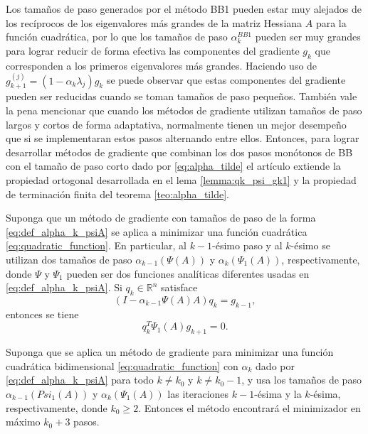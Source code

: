 Los tamaños de paso generados por el método BB1 pueden estar muy alejados de los recíprocos de los eigenvalores más grandes de la matriz Hessiana $A$ para la función cuadrática, por lo que los tamaños de paso $\alpha_k^{BB1}$ pueden ser muy grandes para lograr reducir de forma efectiva las componentes  del gradiente $g_k$ que corresponden a los primeros eigenvalores más grandes. Haciendo uso de $g_{k+1}^{(j)} = (1-\alpha_k\lambda_j)g_k$ se puede observar que estas componentes del gradiente pueden ser reducidas cuando se toman tamaños de paso pequeños. También vale la pena mencionar que cuando los métodos de gradiente utilizan tamaños de paso largos y cortos de forma adaptativa, normalmente tienen un mejor desempeño que si se implementaran estos pasos alternando entre ellos. Entonces, para lograr desarrollar métodos de gradiente que combinan los dos pasos monótonos de BB con el tamaño de paso corto dado por \ref{eq:alpha_tilde} el artículo extiende la propiedad ortogonal desarrollada en el lema \ref{lemma:qk_psi_gk1} y la propiedad de terminación finita del teorema \ref{teo:alpha_tilde}.

\begin{lema}
    Suponga que un método de gradiente con tamaños de paso de la forma \ref{eq:def_alpha_k_psiA} se aplica a minimizar una función cuadrática \ref{eq:quadratic_function}. En particular, al $k-1$-ésimo paso y al $k$-ésimo se utilizan dos tamaños de paso $\alpha_{k-1}(\Psi(A))$ y $\alpha_k(\Psi_1(A))$, respectivamente, donde $\Psi$ y $\Psi_1$ pueden ser dos funciones analíticas diferentes usadas en \ref{eq:def_alpha_k_psiA}. Si $q_k\in\mathbb{R}^n$ satisface
    \begin{equation}
        (I-\alpha_{k-1}\Psi(A)A)q_k = g_{k-1},
    \end{equation}
    entonces se tiene
    \begin{equation}
        q_k^T\Psi_1(A)g_{k+1} = 0.
    \end{equation}
\end{lema}

\begin{teor}
    Suponga que se aplica un método de gradiente para minimizar una función cuadrática bidimensional \ref{eq:quadratic_function} con $\alpha_k$ dado por \ref{eq:def_alpha_k_psiA} para todo $k\neq k_0$ y $k\neq k_0-1$, y usa los tamaños de paso $\alpha_{k-1}(Psi_1(A))$ y $\alpha_k(\Psi_1(A))$ las iteraciones $k-1$-ésima y la $k$-ésima, respectivamente, donde $k_0\geq 2$. Entonces el método encontrará el minimizador en máximo $k_0+3$ pasos.
\end{teor}

